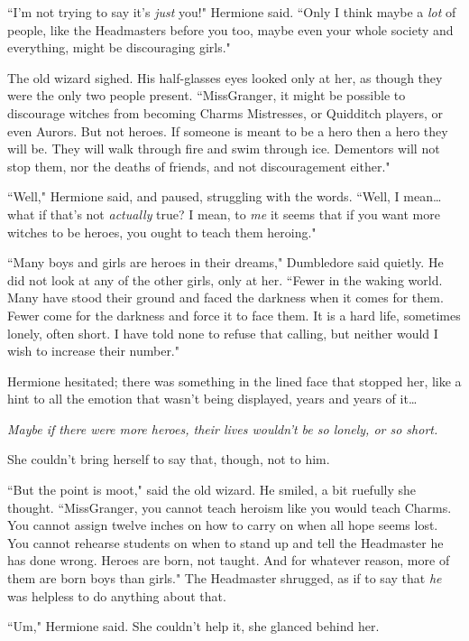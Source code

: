 ``I'm not trying to say it's \emph{just} you!" Hermione said. ``Only I think maybe a \emph{lot} of people, like the Headmasters before you too, maybe even your whole society and everything, might be discouraging girls."

The old wizard sighed. His half-glasses eyes looked only at her, as though they were the only two people present. ``Miss\?Granger, it might be possible to discourage witches from becoming Charms Mistresses, or Quidditch players, or even Aurors. But not heroes. If someone is meant to be a hero then a hero they will be. They will walk through fire and swim through ice. Dementors will not stop them, nor the deaths of friends, and not discouragement either."

``Well," Hermione said, and paused, struggling with the words. ``Well, I mean{\ldots} what if that's not \emph{actually} true? I mean, to \emph{me} it seems that if you want more witches to be heroes, you ought to teach them heroing."

``Many boys and girls are heroes in their dreams," Dumbledore said quietly. He did not look at any of the other girls, only at her. ``Fewer in the waking world. Many have stood their ground and faced the darkness when it comes for them. Fewer come for the darkness and force it to face them. It is a hard life, sometimes lonely, often short. I have told none to refuse that calling, but neither would I wish to increase their number."

Hermione hesitated; there was something in the lined face that stopped her, like a hint to all the emotion that wasn't being displayed, years and years of it{\ldots}

\emph{Maybe if there were more heroes, their lives wouldn't be so lonely, or so short.}

She couldn't bring herself to say that, though, not to him.

``But the point is moot," said the old wizard. He smiled, a bit ruefully she thought. ``Miss\?Granger, you cannot teach heroism like you would teach Charms. You cannot assign twelve inches on how to carry on when all hope seems lost. You cannot rehearse students on when to stand up and tell the Headmaster he has done wrong. Heroes are born, not taught. And for whatever reason, more of them are born boys than girls." The Headmaster shrugged, as if to say that \emph{he} was helpless to do anything about that.

``Um," Hermione said. She couldn't help it, she glanced behind her.

